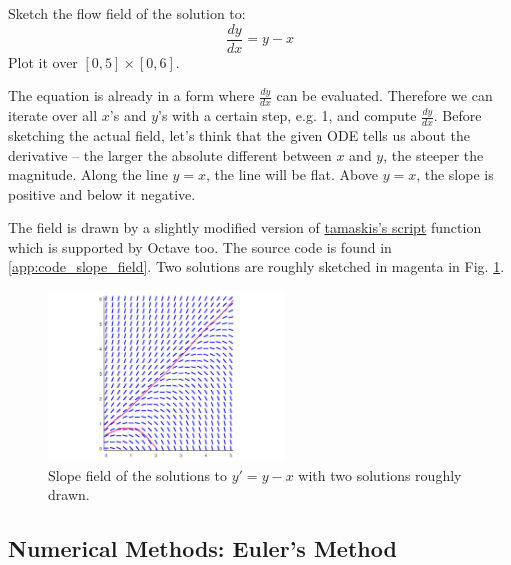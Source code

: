 \documentclass[a4paper]{article}
\begin{document}
\begin{exmp}
Sketch the flow field of the solution to:
\[
\frac{dy}{dx} = y-x
\]
Plot it over $[0, 5] \times [0, 6]$.
\end{exmp}
\begin{soln}
The equation is already in a form where $\tfrac{dy}{dx}$ can be evaluated. Therefore we can iterate over all $x$'s and $y$'s with a certain step, e.g. 1, and compute $\tfrac{dy}{dx}$. Before sketching the actual field, let's think that the given ODE tells us about the derivative -- the larger the absolute different between $x$ and $y$, the steeper the magnitude. Along the line $y=x$, the line will be flat. Above $y=x$, the slope is positive and below it negative.

The field is drawn by a slightly modified version of \href{thttps://github.com/tamaskis/slope_field-MATLAB/blob/main/slope_field.m script}{tamaskis's script} function which is supported by Octave too. The source code is found in \ref{app:code_slope_field}. Two solutions are roughly sketched in magenta in Fig. \ref{fig:flow_field_of_y_x}.

\begin{figure}[H]
    \centering
    \includegraphics[height=4.5cm]{img/flow_fields/slope_field_of_y-x.png}
    \caption{Slope field of the solutions to $y' = y - x$ with two solutions roughly drawn.}
    \label{fig:flow_field_of_y_x}
\end{figure}
\end{soln}



\subsection{Numerical Methods: Euler's Method}
\end{document}
